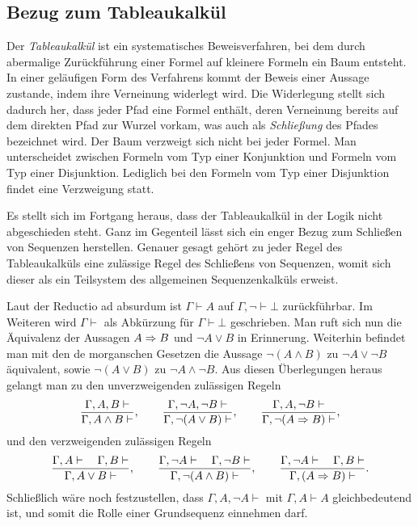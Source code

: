 \subsection{Bezug zum Tableaukalkül}

Der \emph{Tableaukalkül} ist ein
systematisches Beweisverfahren, bei dem durch abermalige Zurückführung
einer Formel auf kleinere Formeln ein Baum entsteht. In einer
geläufigen Form des Verfahrens kommt der Beweis einer Aussage zustande,
indem ihre Verneinung widerlegt wird. Die Widerlegung stellt sich
dadurch her, dass jeder Pfad eine Formel enthält, deren
Verneinung bereits auf dem direkten Pfad zur Wurzel vorkam, was auch
als \emph{Schließung} des Pfades bezeichnet wird. Der Baum verzweigt
sich nicht bei jeder Formel. Man unterscheidet zwischen
Formeln vom Typ einer Konjunktion und Formeln vom Typ einer
Disjunktion. Lediglich bei den Formeln vom Typ einer Disjunktion
findet eine Verzweigung statt.

Es stellt sich im Fortgang heraus, dass der Tableaukalkül in der Logik
nicht abgeschieden steht. Ganz im Gegenteil lässt sich ein enger Bezug
zum Schließen von Sequenzen herstellen. Genauer gesagt gehört zu jeder
Regel des Tableaukalküls eine zulässige Regel des Schließens von
Sequenzen, womit sich dieser als ein Teilsystem des allgemeinen
Sequenzenkalküls erweist.

Laut der Reductio ad absurdum ist $\Gamma\vdash A$ auf
$\Gamma,\lnot\vdash\bot$ zurückführbar. Im Weiteren wird $\Gamma\vdash$
als Abkürzung für $\Gamma\vdash\bot$ geschrieben. Man ruft sich nun
die Äquivalenz der Aussagen $A\Rightarrow B$ und $\lnot A\lor B$ in Erinnerung.
Weiterhin befindet man mit den de morganschen Gesetzen die Aussage
$\lnot (A\land B)$ zu $\lnot A\lor\lnot B$ äquivalent, sowie $\lnot (A\lor B)$
zu $\lnot A\land\lnot B$. Aus diesen Überlegungen heraus
gelangt man zu den unverzweigenden zulässigen Regeln%
\[
\dfrac{\Gamma,A,B\vdash}{\Gamma,A\land B\vdash},\qquad
\dfrac{\Gamma,\lnot A,\lnot B\vdash}{\Gamma,\lnot (A\lor B)\vdash},\qquad
\dfrac{\Gamma,A,\lnot B\vdash}{\Gamma,\lnot(A\Rightarrow B)\vdash},
\]
und den verzweigenden zulässigen Regeln
\[
\dfrac{\Gamma,A\vdash\quad\Gamma,B\vdash}{\Gamma,A\lor B\vdash},\qquad
\dfrac{\Gamma,\lnot A\vdash\quad\Gamma,\lnot B\vdash}{\Gamma,\lnot (A\land B)\vdash},\qquad
\dfrac{\Gamma,\lnot A\vdash\quad\Gamma,B\vdash}{\Gamma,(A\Rightarrow B)\vdash}.
\]
Schließlich wäre noch festzustellen, dass $\Gamma,A,\lnot A\vdash$
mit $\Gamma,A\vdash A$ gleichbedeutend ist, und somit die Rolle einer
Grundsequenz einnehmen darf.

